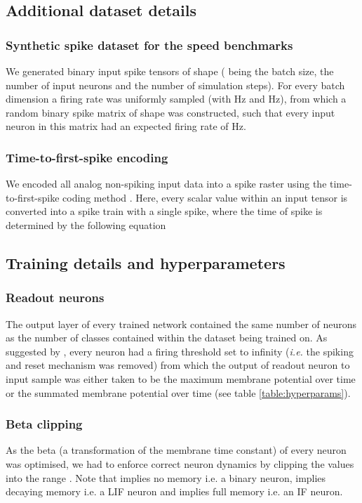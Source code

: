 \documentclass{article} \usepackage{iclr2023_conference,times}
\begin{document}
\subsection{Additional dataset details}
\subsubsection{Synthetic spike dataset for the speed benchmarks}

We generated binary input spike tensors of shape  ( being the batch size,  the number of input neurons and  the number of simulation steps). For every batch dimension  a firing rate  was uniformly sampled (with Hz and Hz), from which a random binary spike matrix of shape  was constructed, such that every input neuron in this matrix had an expected firing rate of Hz.

\subsubsection{Time-to-first-spike encoding}

We encoded all analog non-spiking input data into a spike raster using the time-to-first-spike coding method \citep{kheradpisheh2020temporal}. Here, every scalar value  within an input tensor is converted into a spike train with a single spike, where the time of spike  is determined by the following equation



\subsection{Training details and hyperparameters}

\subsubsection{Readout neurons}
The output layer  of every trained network contained the same number of neurons as the number of classes contained within the dataset being trained on. As suggested by \cite{zenke2021remarkable}, every neuron had a firing threshold set to infinity (\textit{i.e.} the spiking and reset mechanism was removed) from which the output  of readout neuron  to input sample  was either taken to be the maximum membrane potential over time  or the summated membrane potential over time  (see table \ref{table:hyperparams}).

\subsubsection{Beta clipping}
As the beta  (a transformation of the membrane time constant) of every neuron was optimised, we had to enforce correct neuron dynamics by clipping the values into the range . Note that   implies no memory i.e. a binary neuron,  implies decaying memory i.e. a LIF neuron and  implies full memory i.e. an IF neuron.
\end{document}
